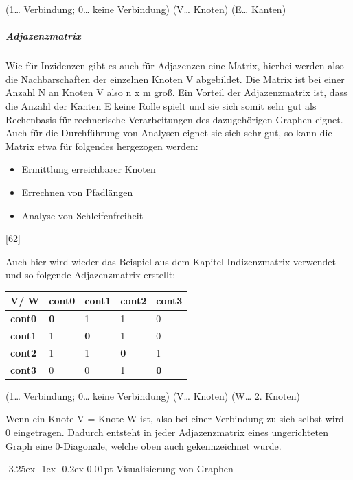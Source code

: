 \documentclass[
    headings=optiontotocandhead,%
    twoside,
    numbers=noenddot,%
    12pt, %
    titlepage, %
    parskip=full, %
    listof=leveldown, 
    numbers=noenddot, %
    a4paper,DIV=14,
    BCOR=15mm,
]{scrbook}
\makeatletter
\providecommand{\tightlist}{%
  \setlength{\itemsep}{0pt}\setlength{\parskip}{0pt}}
\renewcommand\paragraph{\@startsection{paragraph}{4}{\z@}%
    {-3.25ex \@plus -1ex \@minus -0.2ex}%
    {0.01pt}%
    {\raggedsection\normalfont\sectfont\nobreak\size@paragraph}%
  }
\makeatother
\begin{document}
(1\ldots{} Verbindung; 0\ldots{} keine Verbindung) (V\ldots{} Knoten)
(E\ldots{} Kanten)

\hypertarget{adjazenzmatrix}{%
\subparagraph{Adjazenzmatrix}\label{adjazenzmatrix}}

Wie für Inzidenzen gibt es auch für Adjazenzen eine Matrix, hierbei
werden also die Nachbarschaften der einzelnen Knoten V abgebildet. Die
Matrix ist bei einer Anzahl N an Knoten V also n x m groß. Ein Vorteil
der Adjazenzmatrix ist, dass die Anzahl der Kanten E keine Rolle spielt
und sie sich somit sehr gut als Rechenbasis für rechnerische
Verarbeitungen des dazugehörigen Graphen eignet. Auch für die
Durchführung von Analysen eignet sie sich sehr gut, so kann die Matrix
etwa für folgendes hergezogen werden:

\begin{itemize}
\tightlist
\item
  Ermittlung erreichbarer Knoten
\item
  Errechnen von Pfadlängen
\item
  Analyse von Schleifenfreiheit
\end{itemize}

{[}\protect\hyperlink{ref-BigDataInsider}{62}{]}

Auch hier wird wieder das Beispiel aus dem Kapitel Indizenzmatrix
verwendet und so folgende Adjazenzmatrix erstellt:

\begin{longtable}[]{@{}lllll@{}}
\toprule
V/ W & cont0 & cont1 & cont2 & cont3\tabularnewline
\midrule
\endhead
\textbf{cont0} & \textbf{0} & 1 & 1 & 0\tabularnewline
\textbf{cont1} & 1 & \textbf{0} & 1 & 0\tabularnewline
\textbf{cont2} & 1 & 1 & \textbf{0} & 1\tabularnewline
\textbf{cont3} & 0 & 0 & 1 & \textbf{0}\tabularnewline
\bottomrule
\end{longtable}

(1\ldots{} Verbindung; 0\ldots{} keine Verbindung) (V\ldots{} Knoten)
(W\ldots{} 2. Knoten)

Wenn ein Knote V = Knote W ist, also bei einer Verbindung zu sich selbst
wird 0 eingetragen. Dadurch entsteht in jeder Adjazenzmatrix eines
ungerichteten Graph eine 0-Diagonale, welche oben auch gekennzeichnet
wurde.

\hypertarget{visualisierung-von-graphen}{%
\paragraph{Visualisierung von
Graphen}\label{visualisierung-von-graphen}}
\end{document}
